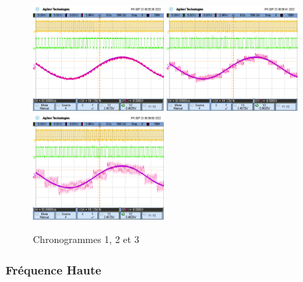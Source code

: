 \documentclass[11pt, openright]{book}
\begin{document}
\begin{figure}[ht]
    \centering
    \includegraphics[width=0.45\textwidth]{./object/g8.png}
    \hspace{0.05\textwidth}
    \includegraphics[width=0.45\textwidth]{./object/g9.png}
    \hspace{0.05\textwidth}
    \includegraphics[width=0.45\textwidth]{./object/g10.png}
    \caption{Chronogrammes 1, 2 et 3}
\end{figure}

\newpage

\subsubsection{Fréquence Haute}
\end{document}
